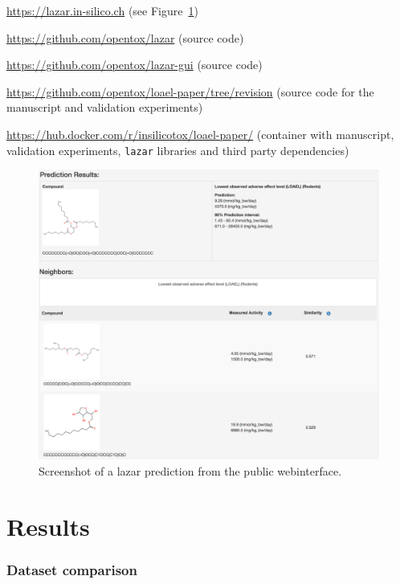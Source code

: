 \documentclass[]{achemso}
\providecommand{\tightlist}{%
  \setlength{\itemsep}{0pt}\setlength{\parskip}{0pt}}
\begin{document}
\begin{description}
\tightlist
\item[Public webinterface]
\url{https://lazar.in-silico.ch} (see Figure~\ref{fig:screenshot})
\item[\texttt{lazar} framework]
\url{https://github.com/opentox/lazar} (source code)
\item[\texttt{lazar} GUI]
\url{https://github.com/opentox/lazar-gui} (source code)
\item[Manuscript]
\url{https://github.com/opentox/loael-paper/tree/revision} (source code
for the manuscript and validation experiments)
\item[Docker image]
\url{https://hub.docker.com/r/insilicotox/loael-paper/} (container with
manuscript, validation experiments, \texttt{lazar} libraries and third
party dependencies)
\end{description}

\begin{figure}
\centering
\includegraphics{figures/lazar-screenshot.pdf}
\caption{Screenshot of a lazar prediction from the public
webinterface.}\label{fig:screenshot}
\end{figure}

\section{Results}\label{results}

\subsubsection{Dataset comparison}\label{dataset-comparison}
\end{document}
